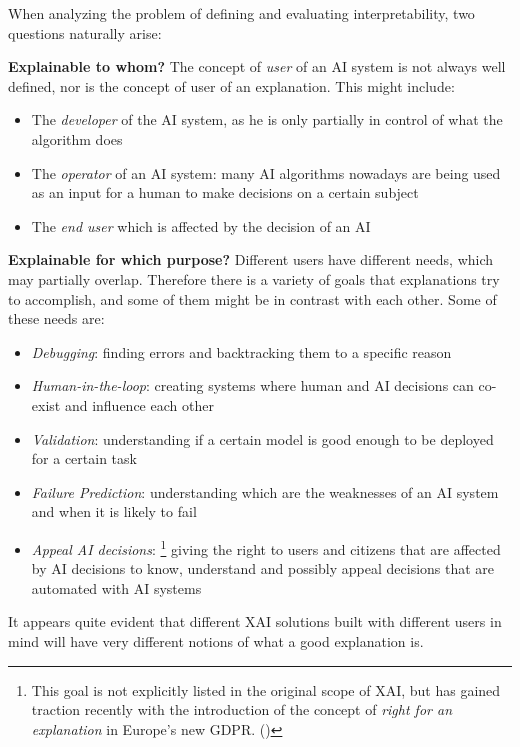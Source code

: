 \documentclass[conference]{IEEEtran}
\begin{document}
When analyzing the problem of defining and evaluating interpretability, two
questions naturally arise:

\textbf{Explainable to whom?} The concept of \textit{user} of an AI system is
not always well defined, nor is the concept of user of an explanation. This
might include:

\begin{itemize}
    \item The \textit{developer} of the AI system, as he is only partially in
          control of what the algorithm does
    \item The \textit{operator} of an AI system: many AI algorithms nowadays are
          being used as an input for a human to make decisions on a certain
          subject
    \item The \textit{end user} which is affected by the decision of an AI
\end{itemize}

\textbf{Explainable for which purpose?} Different users have different needs,
which may partially overlap. Therefore there is a variety of goals that
explanations try to accomplish, and some of them might be in contrast with each
other. Some of these needs are:
\begin{itemize}
    \item \textit{Debugging}: finding errors and backtracking them to a specific
          reason
    \item \textit{Human-in-the-loop}: creating systems where human and AI
          decisions can co-exist and influence each other
    \item \textit{Validation}: understanding if a certain model is good enough
          to be deployed for a certain task
    \item \textit{Failure Prediction}: understanding which are the weaknesses of
          an AI system and when it is likely to fail
    \item \textit{Appeal AI decisions}: \footnote{This goal is not explicitly
              listed in the original scope of XAI, but has gained traction
              recently with the introduction of the concept of \textit{right for
                  an explanation} in Europe's new GDPR. (\cite{righttoexpl})}
          giving the right to users and citizens that are affected by AI
          decisions to know, understand and possibly appeal decisions that
          are automated with AI systems
\end{itemize}

It appears quite evident that different XAI solutions built with different users
in mind will have very different notions of what a good explanation is.
\end{document}
